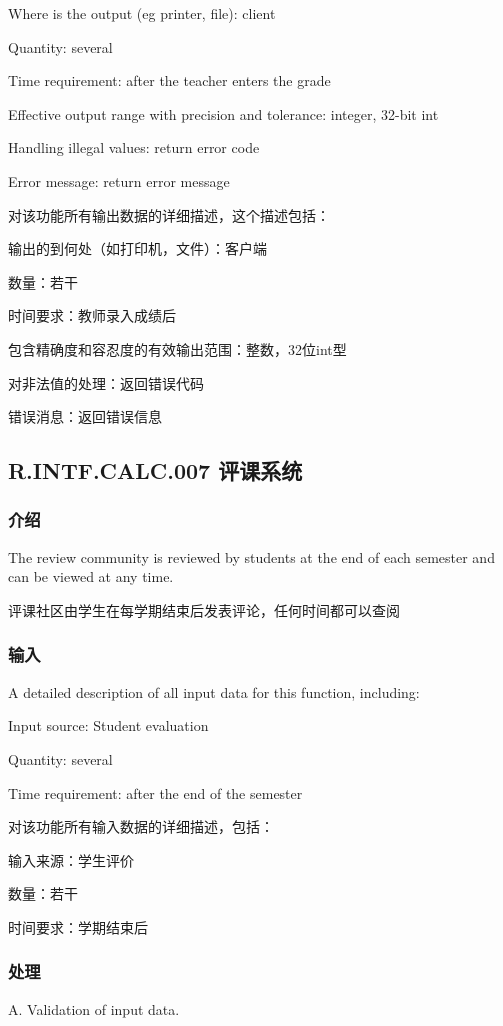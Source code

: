 Where is the output (eg printer, file): client

Quantity: several

Time requirement: after the teacher enters the grade

Effective output range with precision and tolerance: integer, 32-bit int

Handling illegal values: return error code

Error message: return error message

对该功能所有输出数据的详细描述，这个描述包括：

	输出的到何处（如打印机，文件）：客户端

	数量：若干

	时间要求：教师录入成绩后

	包含精确度和容忍度的有效输出范围：整数，32位int型

	对非法值的处理：返回错误代码

	错误消息：返回错误信息
		
\subsection{R.INTF.CALC.007 评课系统}
\subsubsection{介绍}

The review community is reviewed by students at the end of each semester and can be viewed at any time.

评课社区由学生在每学期结束后发表评论，任何时间都可以查阅

\subsubsection{输入}

A detailed description of all input data for this function, including:

Input source: Student evaluation

Quantity: several

Time requirement: after the end of the semester

对该功能所有输入数据的详细描述，包括：

	输入来源：学生评价

	数量：若干

	时间要求：学期结束后
		
\subsubsection{处理}
A. Validation of input data.

